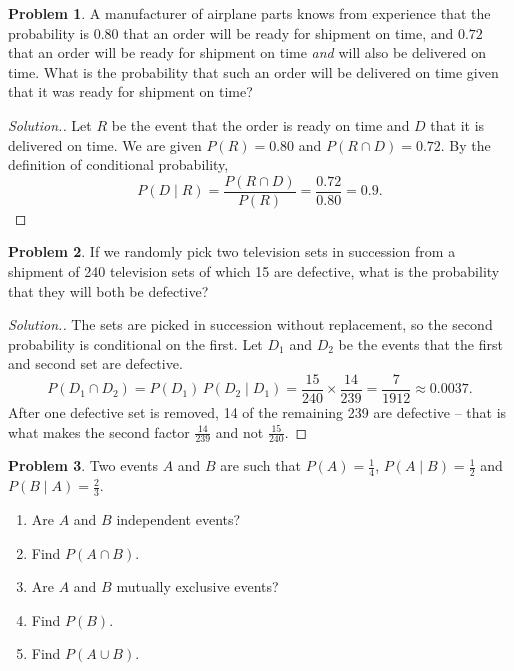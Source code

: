 \documentclass[12pt,a4paper]{report}
\theoremstyle{definition}
\theoremstyle{plain}
\theoremstyle{definition}
\newtheorem{problemx}{Problem}[section]
\newenvironment{problem}{\begin{problemx}}{\end{problemx}}
\newenvironment{solution}
  {\renewcommand{\qedsymbol}{}\begin{proof}[\textit{Solution}.]}
  {\end{proof}}
\begin{document}
\begin{problem}
A manufacturer of airplane parts knows from experience that the probability is $0.80$
that an order will be ready for shipment on time, and $0.72$ that an order will be ready
for shipment on time \emph{and} will also be delivered on time. What is the probability
that such an order will be delivered on time given that it was ready for shipment on
time?
\end{problem}

\begin{solution}
Let $R$ be the event that the order is ready on time and $D$ that it is delivered on
time. We are given $P(R)=0.80$ and $P(R\cap D)=0.72$. By the definition of conditional
probability,
\[P(D\mid R) = \frac{P(R\cap D)}{P(R)} = \frac{0.72}{0.80} = 0.9.\]
\end{solution}

\begin{problem}
If we randomly pick two television sets in succession from a shipment of 240 television
sets of which 15 are defective, what is the probability that they will both be
defective?
\end{problem}

\begin{solution}
The sets are picked in succession without replacement, so the second probability is
conditional on the first. Let $D_1$ and $D_2$ be the events that the first and second
set are defective.
\[P(D_1\cap D_2) = P(D_1)\,P(D_2\mid D_1) = \frac{15}{240}\times\frac{14}{239}
 = \frac{7}{1912} \approx 0.0037.\]
After one defective set is removed, 14 of the remaining 239 are defective -- that is
what makes the second factor $\tfrac{14}{239}$ and not $\tfrac{15}{240}$.
\end{solution}

\begin{problem}
Two events $A$ and $B$ are such that $P(A)=\frac{1}{4}$, $P(A\mid B)=\frac{1}{2}$ and
$P(B\mid A)=\frac{2}{3}$.
\begin{enumerate}
\item[(a).] Are $A$ and $B$ independent events?
\item[(b).] Find $P(A\cap B)$.
\item[(c).] Are $A$ and $B$ mutually exclusive events?
\item[(d).] Find $P(B)$.
\item[(e).] Find $P(A\cup B)$.
\end{enumerate}
\end{problem}
\end{document}
